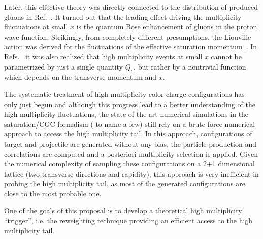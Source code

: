 Later, this effective theory was directly connected to 
the distribution of produced gluons in Ref.~\cite{Kovner:2018azs}. 
It turned out that the leading effect driving  the multiplicity 
fluctuations at small $x$ is the quantum Bose enhancement of gluons in the
proton wave function. Strikingly, from completely different presumptions,
the Liouville action was derived for the fluctuations of the effective saturation 
momentum~\cite{Iancu:2004es,Marquet:2006xm,Iancu:2007st}. 
In Refs.~\cite{Dumitru:2017cwt,Dumitru:2017ftq,Dumitru:2018iko} 
it was also realized that high multiplicity events at small $x$ 
cannot be parametrized by just a single  quantity  $Q_s$, 
but rather by a nontrivial function which depends on the transverse 
momentum and $x$. 

The systematic treatment of high multiplicity 
color charge configurations has only just begun and  
although this progress lead to a better understanding of the high multiplicity fluctuations, 
the state of the art numerical simulations in the saturation/CGC formalism 
(\cite{Mantysaari:2017cni,Mace:2018vwq,Mace:2018yvl} to name a few)
still rely 
on a brute force numerical approach to access the high multiplicity tail. 
In this approach, configurations of target and projectile are generated 
without any bias, the particle production and correlations are computed and a posteriori 
multiplicity selection is applied. 
Given the numerical complexity of sampling these configurations  on a 2+1 dimensional lattice
(two transverse directions and rapidity),  
this approach  is very inefficient in probing the 
high multiplicity tail, as most of the generated configurations are close to the most probable 
one. 

One of the goals of this proposal is to develop a theoretical high multiplicity ``trigger'', 
i.e. the reweighting technique providing  an efficient access to the high multiplicity tail.   

